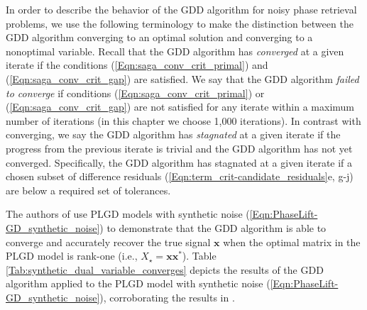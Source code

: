 In order to describe the behavior of the GDD algorithm for noisy phase retrieval problems, we use the following terminology to make the distinction between the GDD algorithm converging to an optimal solution and converging to a nonoptimal variable.
Recall that the GDD algorithm has \textit{converged} at a given iterate if the conditions (\ref{Eqn:saga_conv_crit_primal}) and (\ref{Eqn:saga_conv_crit_gap}) are satisfied.  
We say that the GDD algorithm \textit{failed to converge} if conditions (\ref{Eqn:saga_conv_crit_primal}) or (\ref{Eqn:saga_conv_crit_gap}) are not satisfied for any iterate within a maximum number of iterations (in this chapter we choose 1,000 iterations).
In contrast with converging, we say the GDD algorithm has \textit{stagnated} at a given iterate if the progress from the previous iterate is trivial and the GDD algorithm has not yet converged.
Specifically, the GDD algorithm has stagnated at a given iterate if a chosen subset of difference residuals (\ref{Eqn:term_crit-candidate_residuals}e, g-j) are below a required set of tolerances.











The authors of \cite{DBLP:journals/siamsc/FriedlanderM16} use PLGD models with synthetic noise (\ref{Eqn:PhaseLift-GD_synthetic_noise}) to demonstrate that the GDD algorithm is able to converge and accurately recover the true signal $\mathbf{x}$ when the optimal matrix in the PLGD model is rank-one (i.e., $X_\star = \mathbf{x} \mathbf{x}^*$).  
Table \ref{Tab:synthetic_dual_variable_converges} depicts the results of the GDD algorithm applied to the PLGD model with synthetic noise (\ref{Eqn:PhaseLift-GD_synthetic_noise}), corroborating the results in \cite[Section 5.1.2]{DBLP:journals/siamsc/FriedlanderM16}.

